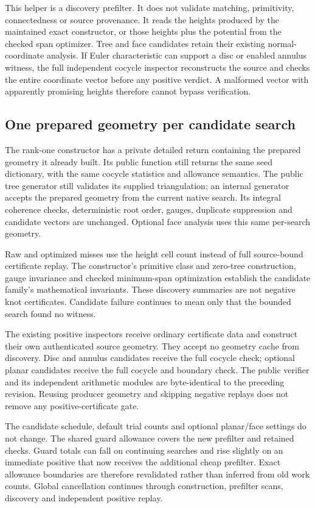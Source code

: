 This helper is a discovery prefilter. It does not validate matching,
primitivity, connectedness or source provenance. It reads the heights
produced by the maintained exact constructor, or those heights plus the
potential from the checked span optimizer. Tree and face candidates retain
their existing normal-coordinate analysis. If Euler characteristic can
support a disc or enabled annulus witness, the full independent cocycle
inspector reconstructs the source and checks the entire coordinate vector
before any positive verdict. A malformed vector with apparently promising
heights therefore cannot bypass verification.

\subsection{One prepared geometry per candidate search}

The rank-one constructor has a private detailed return containing the
prepared geometry it already built. Its public function still returns
the same seed dictionary, with the same cocycle statistics and allowance
semantics. The public tree generator still validates its supplied
triangulation; an internal generator accepts the prepared geometry from
the current native search. Its integral coherence checks, deterministic
root order, gauges, duplicate suppression and candidate vectors are
unchanged. Optional face analysis uses this same per-search geometry.

Raw and optimized misses use the height cell count instead of full
source-bound certificate replay. The constructor's primitive class and
zero-tree construction, gauge invariance and checked minimum-span
optimization establish the candidate family's mathematical invariants.
These discovery summaries are not negative knot certificates. Candidate
failure continues to mean only that the bounded search found no witness.

The existing positive inspectors receive ordinary certificate data and
construct their own authenticated source geometry. They accept no geometry
cache from discovery. Disc and annulus candidates receive the full cocycle
check; optional planar candidates receive the full cocycle and boundary
check. The public verifier and its independent arithmetic modules are
byte-identical to the preceding revision. Reusing producer geometry and
skipping negative replays does not remove any positive-certificate gate.

The candidate schedule, default trial counts and optional planar/face
settings do not change. The shared guard allowance covers the new prefilter
and retained checks. Guard totals can fall on continuing searches and rise
slightly on an immediate positive that now receives the additional cheap
prefilter. Exact allowance boundaries are therefore revalidated rather
than inferred from old work counts. Global cancellation continues through
construction, prefilter scans, discovery and independent positive replay.


